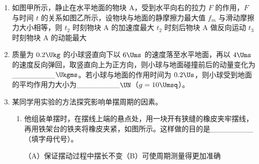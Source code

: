 \documentclass[\gkver]{gaokaozhenti}
\begin{document}
\begin{enumerate}
\item
如图甲所示，静止在水平地面的物块 A，受到水平向右的拉力 $F$ 的作用，$F$ 与时间 $t$ 的关系如图乙所示，设物块与地面的静摩擦力最大值 $f_{m}$ 与滑动摩擦力大小相等，则
{$t_{2}$ 时刻物块 A 的加速度最大}
{$t_{2}$ 时刻后物块 A 做反向运动}
{$t_{3}$ 时刻物块 A 的动能最大}

\item
质量为 $0.2\Ukg$ 的小球竖直向下以 $6\Ums$ 的速度落至水平地面，再以 $4\Ums$ 的速度反向弹回，取竖直向上为正方向，则小球与地面碰撞前后的动量变化为\_\_\_\_\_\_\_\_$\Ukgms$。若小球与地面的作用时间为 $0.2\Us$，则小球受到地面的平均作用力大小为\_\_\_\_\_\_\_\_$\UN$（$g=10\Umsq$）。

\item
某同学用实验的方法探究影响单摆周期的因素。
\begin{enumerate}
	\item
	他组装单摆时，在摆线上端的悬点处，用一块开有狭缝的橡皮夹牢摆线，再用铁架台的铁夹将橡皮夹紧，如图所示。这样做的目的是\_\_\_\_\_\_\_\_（填字母代号）。

	（A）保证摆动过程中摆长不变\quad（B）可使周期测量得更加准确


\end{enumerate}
\end{enumerate}
\end{document}

